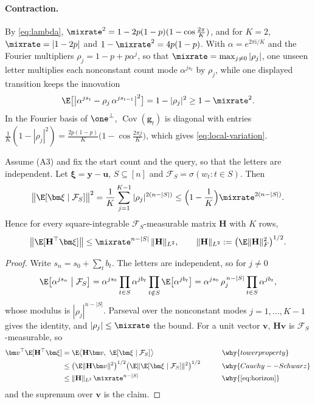 \paragraph{Contraction.}\label{app:contraction} By \cref{eq:lambda}, $\mixrate^2=1-2p(1-p)(1-\cos\tfrac{2\pi}{K})$, and for $K=2$,
$\mixrate=|1-2p|$ and $1-\mixrate^2=4p(1-p)$. With $\alpha=e^{2\pi\mathrm i/K}$ and the Fourier multipliers
$\rho_j=1-p+p\alpha^j$, so that $\mixrate=\max_{j\ne0}|\rho_j|$, one unseen letter multiplies each nonconstant count
mode $\alpha^{js_t}$ by $\rho_j$, while one displayed transition keeps the innovation
\begin{equation}
 \E\bigl[\bigl|\alpha^{j s_t}-\rho_j\,\alpha^{j s_{t-1}}\bigr|^2\bigr]=1-|\rho_j|^2\ge1-\mixrate^2 .
 \label{eq:move-variance}
\end{equation}
In the Fourier basis of $\one^\perp$, $\operatorname{Cov}(\bm g_t)$ is diagonal with entries $\tfrac{1}{K}(1-|\rho_j|^2)=\tfrac{2p(1-p)}{K}\bigl(1-\cos\tfrac{2\pi j}{K}\bigr)$,
which gives \cref{eq:local-variation}.

\begin{lemma}
\label{lem:target-contraction}
Assume (A3) and fix the start count and the query, so that the letters are independent. Let $\bm\xi=\bm y-\bm u$, $S\subseteq[n]$ and $\mathcal F_S=\sigma(w_t:t\in S)$. Then
\begin{equation}
 \bigl\|\E[\bm\xi\mid\mathcal F_S]\bigr\|^2=\frac{1}{K}\sum_{j=1}^{K-1}|\rho_j|^{2(n-|S|)}\le\Bigl(1-\frac{1}{K}\Bigr)\mixrate^{2(n-|S|)} .
 \label{eq:horizon}
\end{equation}
Hence for every square-integrable $\mathcal F_S$-measurable matrix $\mathbf H$ with $K$ rows,
\[
 \bigl\|\E[\mathbf H^\top\bm\xi]\bigr\|\le\mixrate^{n-|S|}\,\|\mathbf H\|_{L^2},\qquad \|\mathbf H\|_{L^2}:=\bigl(\E\|\mathbf H\|_F^2\bigr)^{1/2}.
\]
\end{lemma}

\begin{proof}
Write $s_n=s_0+\sum_tb_t$. The letters are independent, so for $j\ne0$
\[
 \E\bigl[\alpha^{js_n}\bigm|\mathcal F_S\bigr]=\alpha^{js_0}\prod_{t\in S}\alpha^{jb_t}\prod_{t\notin S}\E\bigl[\alpha^{jb_t}\bigr]=\alpha^{js_0}\,\rho_j^{\,n-|S|}\prod_{t\in S}\alpha^{jb_t},
\]
whose modulus is $|\rho_j|^{n-|S|}$. Parseval over the nonconstant modes $j=1,\ldots,K-1$ gives the identity, and $|\rho_j|\le\mixrate$ the bound.
For a unit vector $\bm v$, $\mathbf H\bm v$ is $\mathcal F_S$-measurable, so
\begin{alignat*}{2}
 \bm v^\top\E[\mathbf H^\top\bm\xi]&=\E\bigl\langle\mathbf H\bm v,\ \E[\bm\xi\mid\mathcal F_S]\bigr\rangle &\qquad& \why{tower property}\\
 &\le\bigl(\E\|\mathbf H\bm v\|^2\bigr)^{1/2}\bigl(\E\|\E[\bm\xi\mid\mathcal F_S]\|^2\bigr)^{1/2} && \why{Cauchy--Schwarz}\\
 &\le\|\mathbf H\|_{L^2}\,\mixrate^{n-|S|} && \why{\cref{eq:horizon}}
\end{alignat*}
and the supremum over $\bm v$ is the claim.
\end{proof}

